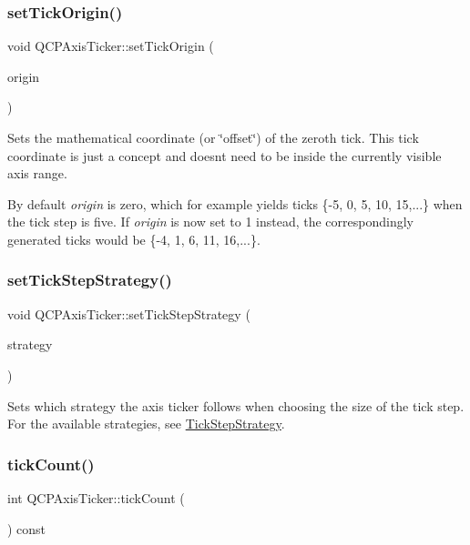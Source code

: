 \subsubsection{\texorpdfstring{set\+Tick\+Origin()}{setTickOrigin()}}
{\footnotesize\ttfamily void Q\+C\+P\+Axis\+Ticker\+::set\+Tick\+Origin (\begin{DoxyParamCaption}\item[{double}]{origin }\end{DoxyParamCaption})}

Sets the mathematical coordinate (or \char`\"{}offset\char`\"{}) of the zeroth tick. This tick coordinate is just a concept and doesn\textquotesingle{}t need to be inside the currently visible axis range.

By default {\itshape origin} is zero, which for example yields ticks \{-\/5, 0, 5, 10, 15,...\} when the tick step is five. If {\itshape origin} is now set to 1 instead, the correspondingly generated ticks would be \{-\/4, 1, 6, 11, 16,...\}. \mbox{\label{class_q_c_p_axis_ticker_a73b1d847c1a12159af6bfda4ebebe7d5}} 
\subsubsection{\texorpdfstring{set\+Tick\+Step\+Strategy()}{setTickStepStrategy()}}
{\footnotesize\ttfamily void Q\+C\+P\+Axis\+Ticker\+::set\+Tick\+Step\+Strategy (\begin{DoxyParamCaption}\item[{\hyperlink{class_q_c_p_axis_ticker_ab6d2f9d9477821623ac9bc4b21ddf49a}{Q\+C\+P\+Axis\+Ticker\+::\+Tick\+Step\+Strategy}}]{strategy }\end{DoxyParamCaption})}

Sets which strategy the axis ticker follows when choosing the size of the tick step. For the available strategies, see \hyperlink{class_q_c_p_axis_ticker_ab6d2f9d9477821623ac9bc4b21ddf49a}{Tick\+Step\+Strategy}. \mbox{\label{class_q_c_p_axis_ticker_aaf9edbe4169ce55e216fd067cc139452}} 
\subsubsection{\texorpdfstring{tick\+Count()}{tickCount()}}
{\footnotesize\ttfamily int Q\+C\+P\+Axis\+Ticker\+::tick\+Count (\begin{DoxyParamCaption}{ }\end{DoxyParamCaption}) const\hspace{0.3cm}{\ttfamily [inline]}}

